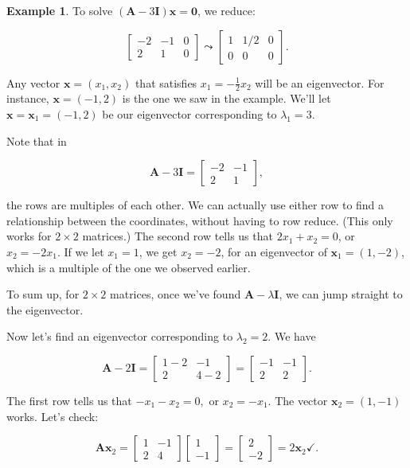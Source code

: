 \documentclass[
]{book}
\theoremstyle{definition}
\theoremstyle{definition}
\newtheorem{example}{Example}[chapter]
\theoremstyle{definition}
\theoremstyle{definition}
\theoremstyle{remark}
\begin{document}
\begin{examplebox}
\begin{example}
To solve \((\mathbf{A}-3\mathbf{I})\mathbf{x}=\mathbf{0}\), we reduce:

\[\left[\begin{array}{rr|r}-2 & -1 & 0\\2 & 1 & 0\end{array}\right] \leadsto \left[\begin{array}{rr|r} 1 & 1/2 & 0\\0 & 0 & 0\end{array}\right].\]

Any vector \(\mathbf{x}=(x_1,x_2)\) that satisfies \(x_1=-\frac{1}{2}x_2\) will be an eigenvector. For instance, \(\mathbf{x}=(-1,2)\) is the one we saw in the example. We'll let \(\mathbf{x}=\mathbf{x}_1=(-1,2)\) be our eigenvector corresponding to \(\lambda_1=3.\)

Note that in

\[\mathbf{A}-3\mathbf{I}=\begin{bmatrix}-2 & -1 \\2 & 1\end{bmatrix},\]

the rows are multiples of each other. We can actually use either row to find a relationship between the coordinates, without having to row reduce. (This only works for \(2\times 2\) matrices.) The second row tells us that \(2x_1+x_2=0\), or \(x_2=-2x_1\). If we let \(x_1=1\), we get \(x_2=-2\), for an eigenvector of \(\mathbf{x}_1=(1,-2)\), which is a multiple of the one we observed earlier.

To sum up, for \(2\times 2\) matrices, once we've found \(\mathbf{A}-\lambda \mathbf{I}\), we can jump straight to the eigenvector.

Now let's find an eigenvector corresponding to \(\lambda_2=2\). We have

\[\mathbf{A}-2\mathbf{I}=\begin{bmatrix}1-2 & -1 \\2 & 4-2\end{bmatrix}=\begin{bmatrix}-1 & -1 \\2 & 2\end{bmatrix}.\]

The first row tells us that \(-x_1-x_2=0,\) or \(x_2=-x_1\). The vector \(\mathbf{x}_2=(1,-1)\) works. Let's check:

\[\mathbf{A}\mathbf{x}_2=\begin{bmatrix}1 & -1\\2 & 4\end{bmatrix}\begin{bmatrix}1\\-1\end{bmatrix}=\begin{bmatrix}2\\-2\end{bmatrix}=2\mathbf{x}_2\checkmark.\]
\end{example}

\end{examplebox}
\end{document}
